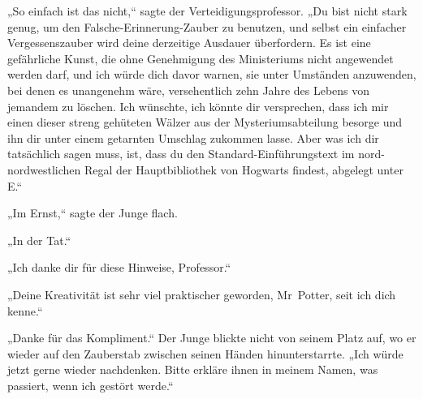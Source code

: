 „So einfach ist das nicht,“ sagte der Verteidigungsprofessor. „Du bist nicht stark genug, um den Falsche-Erinnerung-Zauber zu benutzen, und selbst ein einfacher Vergessenszauber wird deine derzeitige Ausdauer überfordern. Es ist eine gefährliche Kunst, die ohne Genehmigung des Ministeriums nicht angewendet werden darf, und ich würde dich davor warnen, sie unter Umständen anzuwenden, bei denen es unangenehm wäre, versehentlich zehn Jahre des Lebens von jemandem zu löschen. Ich wünschte, ich könnte dir versprechen, dass ich mir einen dieser streng gehüteten Wälzer aus der Mysteriumsabteilung besorge und ihn dir unter einem getarnten Umschlag zukommen lasse. Aber was ich dir tatsächlich sagen muss, ist, dass du den Standard-Einführungstext im nord-nordwestlichen Regal der Hauptbibliothek von Hogwarts findest, abgelegt unter E.“

„Im Ernst,“ sagte der Junge flach.

„In der Tat.“

„Ich danke dir für diese Hinweise, Professor.“

„Deine Kreativität ist sehr viel praktischer geworden, Mr~Potter, seit ich dich kenne.“

„Danke für das Kompliment.“
Der Junge blickte nicht von seinem Platz auf, wo er wieder auf den Zauberstab zwischen seinen Händen hinunterstarrte.
„Ich würde jetzt gerne wieder nachdenken. Bitte erkläre ihnen in meinem Namen, was passiert, wenn ich gestört werde.“


